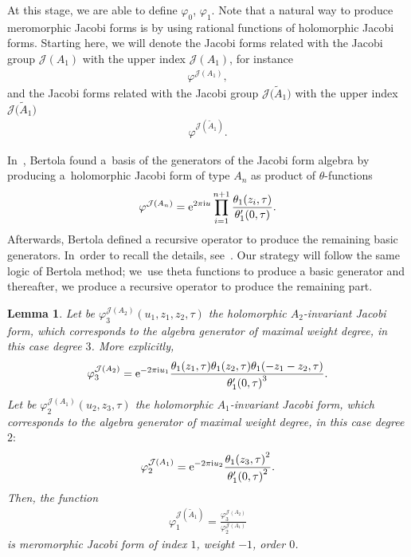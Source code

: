\documentclass[10pt,a4paper]{amsart}
\numberwithin{equation}{section}
\newtheorem{Lemma}[Theorem]{Lemma}
\newcommand{\Ja}{\mathcal{J}}
\begin{document}
At this stage, we are able to define $\varphi_0$, $\varphi_1$. Note that a natural way to produce meromorphic Jacobi forms is by using rational functions of holomorphic Jacobi forms. Starting here, we will denote the Jacobi forms related with the Jacobi group $\Ja(A_1)$ with the upper index $\Ja(A_1)$, for instance
\begin{gather*}
\varphi^{\Ja(A_1)},
\end{gather*}
and the Jacobi forms related with the Jacobi group $\Ja\big(\tilde A_1\big)$ with the upper index $\Ja\big(\tilde A_1\big)$
\begin{gather*}
\varphi^{\Ja(\tilde A_1)}.
\end{gather*}

In~\cite{BertolaM.1}, Bertola found a~basis of the generators of the Jacobi form algebra by producing a~holomorphic Jacobi form of type $A_n$ as product of $\theta$-functions
\begin{gather*}
\varphi^{\Ja(A_n)}={\rm e}^{2\pi {\rm i} u}\prod_{i=1}^{n+1} \frac{\theta_1(z_i,\tau)}{\theta_1^{\prime}(0,\tau)}.
\end{gather*}
Afterwards, Bertola defined a recursive operator to produce the remaining basic generators. In~order to recall the details, see~\cite{BertolaM.1}. Our strategy will follow the same logic of Bertola method; we~use theta functions to produce a basic generator and thereafter, we produce a recursive operator to produce the remaining part.

\begin{Lemma}
 Let be $\varphi_3^{\Ja(A_2)}(u_1,z_1,z_2,\tau)$ the holomorphic $A_2$-invariant Jacobi form, which corresponds to the algebra generator of maximal weight degree, in this case degree $3$. More exp\-li\-citly,
\begin{gather*}
\varphi_3^{\Ja(A_2)}={\rm e}^{-2\pi {\rm i} u_1}\frac{\theta_1(z_1,\tau)\theta_1(z_2,\tau)\theta_1(-z_1-z_2,\tau)}{{\theta_1^{\prime}(0,\tau)}^3}.
\end{gather*}
Let be $\varphi_2^{\Ja(A_1)}(u_2,z_3,\tau)$ the holomorphic $A_1$-invariant Jacobi form, which corresponds to the algebra generator of maximal weight degree, in this case degree $2{:}$
\begin{gather*}
\varphi_2^{\Ja(A_1)}={\rm e}^{-2\pi {\rm i} u_2}\frac{{\theta_1(z_3,\tau)}^2}{{\theta_1^{\prime}(0,\tau)}^2}.
\end{gather*}
Then, the function
\begin{gather}\label{varphi1 def Jtildea1}
\varphi_1^{\Ja(\tilde A_1)}=\frac{\varphi_3^{\Ja(A_2)}}{\varphi_2^{\Ja(A_1)}}
\end{gather}
is meromorphic Jacobi form of index $1$, weight $-1$, order $0$.
\end{Lemma}
\end{document}
